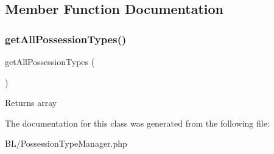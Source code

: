 \subsection{Member Function Documentation}
\mbox{\label{class_app_1_1_b_l_1_1_possession_type_manager_a443ec48b7dd0ee85b22203c22f61efe2}} 
\subsubsection{\texorpdfstring{getAllPossessionTypes()}{getAllPossessionTypes()}}
{\footnotesize\ttfamily get\+All\+Possession\+Types (\begin{DoxyParamCaption}{ }\end{DoxyParamCaption})}

\begin{DoxyReturn}{Returns}
array 
\end{DoxyReturn}


The documentation for this class was generated from the following file\+:\begin{DoxyCompactItemize}
\item 
B\+L/Possession\+Type\+Manager.\+php\end{DoxyCompactItemize}
